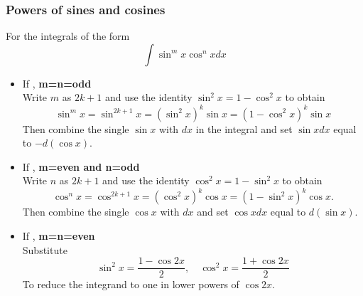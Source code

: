 \subsubsection{Powers of sines and cosines}
For the integrals of the form $$\int \sin ^{m} x \cos ^{n} x d x$$
\begin{itemize}
	\item If , \textbf{m=n=odd}\\
	Write $m$ as $2 k+1$ and use the identity $\sin ^{2} x=1-\cos ^{2} x$ to obtain
	$$
	\sin ^{m} x=\sin ^{2 k+1} x=\left(\sin ^{2} x\right)^{k} \sin x=\left(1-\cos ^{2} x\right)^{k} \sin x
	$$
	Then combine the single $\sin x$ with $d x$ in the integral and set $\sin x d x$ equal to $-d(\cos x)$.
	\item If , \textbf{m=even and n=odd}\\
	 Write $n$ as $2 k+1$ and use the identity $\cos ^{2} x=1-\sin ^{2} x$ to obtain
	$$
	\cos ^{n} x=\cos ^{2 k+1} x=\left(\cos ^{2} x\right)^{k} \cos x=\left(1-\sin ^{2} x\right)^{k} \cos x .
	$$
	Then combine the single $\cos x$ with $d x$ and set $\cos x d x$ equal to $d(\sin x)$.
	\item If , \textbf{m=n=even}\\
	Substitute
	$$
	\sin ^{2} x=\frac{1-\cos 2 x}{2}, \quad \cos ^{2} x=\frac{1+\cos 2 x}{2}
	$$
	To reduce the integrand to one in lower powers of $\cos 2 x$.
\end{itemize}

